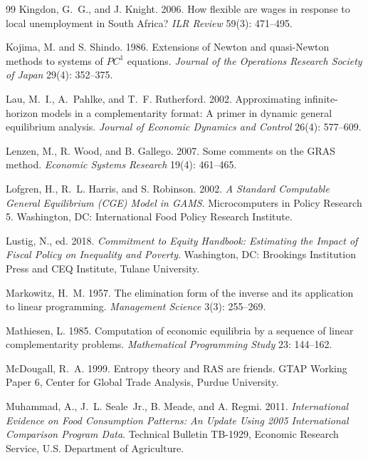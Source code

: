 \begin{thebibliography}{99}
Kingdon, G.~G., and J. Knight. 2006.
\newblock How flexible are wages in response to local unemployment in South
  Africa?
\newblock \emph{ILR Review} 59(3): 471--495.

Kojima, M. and S. Shindo. 1986.
\newblock Extensions of Newton and quasi-Newton methods to systems of
  $PC^1$ equations.
\newblock \emph{Journal of the Operations Research Society of Japan} 29(4):
  352--375.

Lau, M.~I., A.~Pahlke, and T.~F. Rutherford. 2002.
\newblock Approximating infinite-horizon models in a complementarity format:
  A primer in dynamic general equilibrium analysis.
\newblock \emph{Journal of Economic Dynamics and Control} 26(4): 577--609.

Lenzen, M., R. Wood, and B. Gallego. 2007.
\newblock Some comments on the GRAS method.
\newblock \emph{Economic Systems Research} 19(4): 461--465.

Lofgren, H., R.~L. Harris, and S. Robinson. 2002.
\newblock \emph{A Standard Computable General Equilibrium (CGE) Model in
  GAMS}.
\newblock Microcomputers in Policy Research 5. Washington, DC: International
  Food Policy Research Institute.

Lustig, N., ed. 2018.
\newblock \emph{Commitment to Equity Handbook: Estimating the Impact of Fiscal
  Policy on Inequality and Poverty}.
\newblock Washington, DC: Brookings Institution Press and CEQ Institute,
  Tulane University.

Markowitz, H.~M. 1957.
\newblock The elimination form of the inverse and its application to linear
  programming.
\newblock \emph{Management Science} 3(3): 255--269.

Mathiesen, L. 1985.
\newblock Computation of economic equilibria by a sequence of linear
  complementarity problems.
\newblock \emph{Mathematical Programming Study} 23: 144--162.

McDougall, R.~A. 1999.
\newblock Entropy theory and RAS are friends.
\newblock GTAP Working Paper 6, Center for Global Trade Analysis, Purdue
  University.

Muhammad, A., J.~L. Seale~Jr., B. Meade, and A. Regmi. 2011.
\newblock \emph{International Evidence on Food Consumption Patterns: An
  Update Using 2005 International Comparison Program Data}.
\newblock Technical Bulletin TB-1929, Economic Research Service, U.S.
  Department of Agriculture.


\end{thebibliography}
